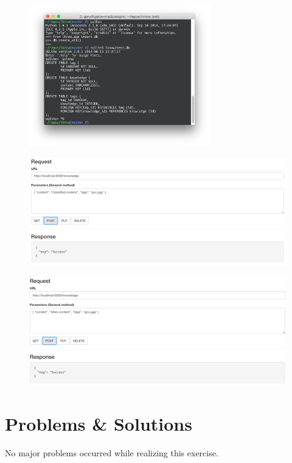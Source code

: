 \documentclass[11pt, a4paper]{article}
\begin{document}
\begin{figure}[h!]
  \centering
  \includegraphics[width=0.7\textwidth]{img/schema}
\end{figure}

\begin{figure}[h!]
  \includegraphics[width=\textwidth]{img/testput0}
\end{figure}

\begin{figure}[h!]
  \includegraphics[width=\textwidth]{img/testput1}
\end{figure}

\section{Problems \& Solutions}

No major problems occurred while realizing this exercise.

\nocite{*}


\end{document}

